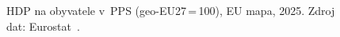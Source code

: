 \def\strEuPrijemPpsTitle{\acs{HDP} na obyvatele v~\acs{PPS} (2025)}%
\def\strEuPrijemPpsColorbarLabel{\acs{HDP} na obyvatele [\acs{PPS}, \acs{geo-EU}27 = 100]}%
\def\strEuPrijemPpsCaption{\acs{HDP} na obyvatele v~\acs{PPS} (\acs{geo-EU}27\,=\,100), EU mapa, 2025. Zdroj dat: Eurostat~\cite{eurostat_nama_10_pc_PPS_EU27eq100}.}%
%

\providecommand\NudgeEuPrijemPpsCz{0pt}%
\providecommand\NudgeEuPrijemPpsDk{0pt}%
\providecommand\NudgeEuPrijemPpsAt{0pt}%
\providecommand\NudgeEuPrijemPpsDe{0pt}%
\providecommand\NudgeEuPrijemPpsPl{0pt}%
\providecommand\NudgeEuPrijemPpsSk{0pt}%
\begin{figure}[H]
  \centering
  \resizebox{\linewidth}{!}{}
  \caption{\strEuPrijemPpsCaption}
  \label{fig:eu_prijem_pps}
\end{figure}
